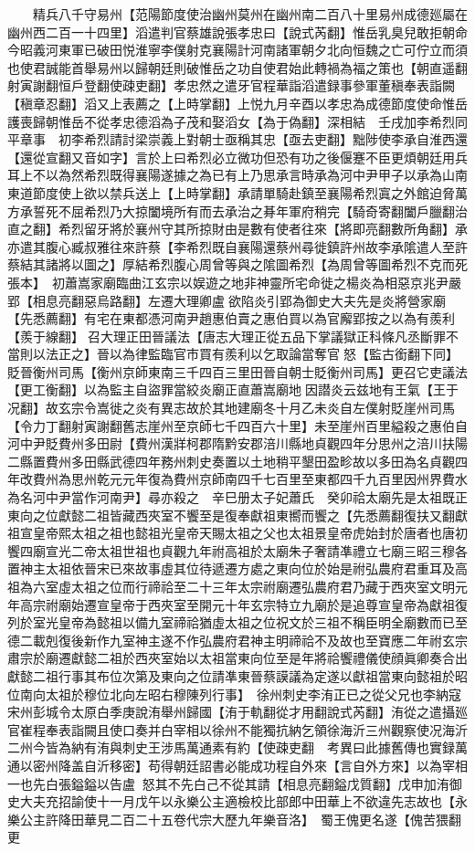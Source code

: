 　　精兵八千守易州【范陽節度使治幽州莫州在幽州南二百八十里易州成德廵屬在幽州西二百一十四里】滔遣判官蔡雄說張孝忠曰【說式芮翻】惟岳乳臭兒敢拒朝命今昭義河東軍已破田悦淮寧李僕射克襄陽計河南諸軍朝夕北向恒魏之亡可佇立而須也使君誠能首舉易州以歸朝廷則破惟岳之功自使君始此轉禍為福之策也【朝直遥翻射寅謝翻恒戶登翻使疎吏翻】孝忠然之遣牙官程華詣滔遣録事參軍董稹奉表詣闕【稹章忍翻】滔又上表薦之【上時掌翻】上悦九月辛酉以孝忠為成德節度使命惟岳護喪歸朝惟岳不從孝忠德滔為子茂和娶滔女【為于偽翻】深相結　壬戌加李希烈同平章事　初李希烈請討梁崇義上對朝士亟稱其忠【亟去吏翻】黜陟使李承自淮西還【還從宣翻又音如字】言於上曰希烈必立微功但恐有功之後偃蹇不臣更煩朝廷用兵耳上不以為然希烈既得襄陽遂據之為已有上乃思承言時承為河中尹甲子以承為山南東道節度使上欲以禁兵送上【上時掌翻】承請單騎赴鎮至襄陽希烈寘之外館迫脅萬方承誓死不屈希烈乃大掠闔境所有而去承治之朞年軍府稍完【騎奇寄翻闔戶臘翻治直之翻】希烈留牙將於襄州守其所掠財由是數有使者往來【將即亮翻數所角翻】承亦遣其腹心臧叔雅往來許蔡【李希烈既自襄陽還蔡州尋徙鎮許州故李承隂遣人至許蔡結其諸將以圖之】厚結希烈腹心周曾等與之隂圖希烈【為周曾等圖希烈不克而死張本】　初蕭嵩家廟臨曲江玄宗以娱遊之地非神靈所宅命徙之楊炎為相惡京兆尹嚴郢【相息亮翻惡烏路翻】左遷大理卿盧欲陷炎引郢為御史大夫先是炎將營家廟【先悉薦翻】有宅在東都憑河南尹趙惠伯賣之惠伯買以為官廨郢按之以為有羨利【羨于線翻】召大理正田晉議法【唐志大理正從五品下掌議獄正科條凡丞斷罪不當則以法正之】晉以為律監臨官市買有羨利以乞取論當奪官怒【監古銜翻下同】貶晉衡州司馬【衡州京師東南三千四百三里田晉自朝士貶衡州司馬】更召它吏議法【更工衡翻】以為監主自盜罪當絞炎廟正直蕭嵩廟地因譛炎云兹地有王氣【王于况翻】故玄宗令嵩徙之炎有異志故於其地建廟冬十月乙未炎自左僕射貶崖州司馬【令力丁翻射寅謝翻舊志崖州至京師七千四百六十里】未至崖州百里縊殺之惠伯自河中尹貶費州多田尉【費州漢牂柯郡隋黔安郡涪川縣地貞觀四年分思州之涪川扶陽二縣置費州多田縣武德四年務州刺史奏置以土地稍平墾田盈畛故以多田為名貞觀四年改費州為思州乾元元年復為費州京師南四千七百里至東都四千九百里因州界費水為名河中尹當作河南尹】尋亦殺之　辛巳册太子妃蕭氏　癸卯祫太廟先是太祖既正東向之位獻懿二祖皆藏西夾室不饗至是復奉獻祖東嚮而饗之【先悉薦翻復扶又翻獻祖宣皇帝熙太祖之祖也懿祖光皇帝天賜太祖之父也太祖景皇帝虎始封於唐者也唐初饗四廟宣光二帝太祖世祖也貞觀九年祔高祖於太廟朱子奢請凖禮立七廟三昭三穆各置神主太祖依晉宋已來故事虛其位待遞遷方處之東向位於始是祔弘農府君重耳及高祖為六室虛太祖之位而行禘祫至二十三年太宗祔廟遷弘農府君乃藏于西夾室文明元年高宗祔廟始遷宣皇帝于西夾室至開元十年玄宗特立九廟於是追尊宣皇帝為獻祖復列於室光皇帝為懿祖以備九室禘祫猶虛太祖之位祝文於三祖不稱臣明全廟數而已至德二載剋復後新作九室神主遂不作弘農府君神主明禘祫不及故也至寶應二年祔玄宗肅宗於廟遷獻懿二祖於西夾室始以太祖當東向位至是年將祫饗禮儀使顔眞卿奏合出獻懿二祖行事其布位次第及東向之位請凖東晉蔡謨議為定遂以獻祖當東向懿祖於昭位南向太祖於穆位北向左昭右穆陳列行事】　徐州刺史李洧正已之從父兄也李納寇宋州彭城令太原白季庚說洧舉州歸國【洧于軌翻從才用翻說式芮翻】洧從之遣攝廵官崔程奉表詣闕且使口奏并白宰相以徐州不能獨抗納乞領徐海沂三州觀察使况海沂二州今皆為納有洧與刺史王涉馬萬通素有約【使疎吏翻　考異曰此據舊傳也實録萬通以密州降盖自沂移密】苟得朝廷詔書必能成功程自外來【言自外方來】以為宰相一也先白張鎰鎰以告盧怒其不先白己不從其請【相息亮翻鎰戊質翻】戊申加洧御史大夫充招諭使十一月戊午以永樂公主適檢校比部郎中田華上不欲違先志故也【永樂公主許降田華見二百二十五卷代宗大歷九年樂音洛】　蜀王傀更名遂【傀苦猥翻更